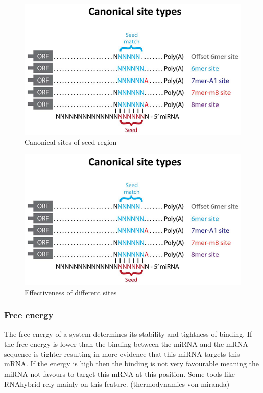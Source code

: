 \documentclass[12pt]{article}
\begin{document}
\begin{figure}
\centering
\includegraphics[width=\textwidth]{results/canonical_sites.png}
\caption{Canonical sites of seed region}
\label{Fig:canonical}
\end{figure}


\begin{figure}
\includegraphics[scale=1]{results/canonical_sites.png}
\caption{Effectiveness of different sites}
\label{types}
\end{figure}

\subsubsection{Free energy}
The free energy of a system determines its stability and tightness of binding. If the free energy is lower than the binding between the miRNA and the mRNA sequence is tighter resulting in more evidence that this miRNA targets this mRNA. If the energy is high then the binding is not very favourable meaning the miRNA not favours to target this mRNA at this position. Some tools like RNAhybrid \cite{Rehmsmeier} rely mainly on this feature. (thermodynamics von miranda)
 
\end{document}
